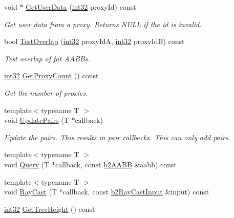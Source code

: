 \begin{DoxyCompactItemize}
void $\ast$ \mbox{\hyperlink{classb2_broad_phase_a3b85893e3cf18b43087cb96b0b9076d1}{Get\+User\+Data}} (\mbox{\hyperlink{b2_settings_8h_a43d43196463bde49cb067f5c20ab8481}{int32}} proxy\+Id) const
\begin{DoxyCompactList}\small\item\em Get user data from a proxy. Returns N\+U\+LL if the id is invalid. \end{DoxyCompactList}\item 
bool \mbox{\hyperlink{classb2_broad_phase_a263cc21e2a3f1f892c20b048eca3cad6}{Test\+Overlap}} (\mbox{\hyperlink{b2_settings_8h_a43d43196463bde49cb067f5c20ab8481}{int32}} proxy\+IdA, \mbox{\hyperlink{b2_settings_8h_a43d43196463bde49cb067f5c20ab8481}{int32}} proxy\+IdB) const
\begin{DoxyCompactList}\small\item\em Test overlap of fat A\+A\+B\+Bs. \end{DoxyCompactList}\item 
\mbox{\hyperlink{b2_settings_8h_a43d43196463bde49cb067f5c20ab8481}{int32}} \mbox{\hyperlink{classb2_broad_phase_ab7a8c31223d8404b79f6c57e8fc69837}{Get\+Proxy\+Count}} () const
\begin{DoxyCompactList}\small\item\em Get the number of proxies. \end{DoxyCompactList}\item 
{\footnotesize template$<$typename T $>$ }\\void \mbox{\hyperlink{classb2_broad_phase_a0a1acd693466b997700242ae00784c20}{Update\+Pairs}} (T $\ast$callback)
\begin{DoxyCompactList}\small\item\em Update the pairs. This results in pair callbacks. This can only add pairs. \end{DoxyCompactList}\item 
{\footnotesize template$<$typename T $>$ }\\void \mbox{\hyperlink{classb2_broad_phase_a187586ea98b9d16e5ef6e12fa31f8de2}{Query}} (T $\ast$callback, const \mbox{\hyperlink{structb2_a_a_b_b}{b2\+A\+A\+BB}} \&aabb) const
\item 
{\footnotesize template$<$typename T $>$ }\\void \mbox{\hyperlink{classb2_broad_phase_ae65392ea91c7d0839ed5312f78b2837a}{Ray\+Cast}} (T $\ast$callback, const \mbox{\hyperlink{structb2_ray_cast_input}{b2\+Ray\+Cast\+Input}} \&input) const
\item 
\mbox{\hyperlink{b2_settings_8h_a43d43196463bde49cb067f5c20ab8481}{int32}} \mbox{\hyperlink{classb2_broad_phase_a868f95225d62c3ea79d231ed305253ea}{Get\+Tree\+Height}} () const

\end{DoxyCompactItemize}
